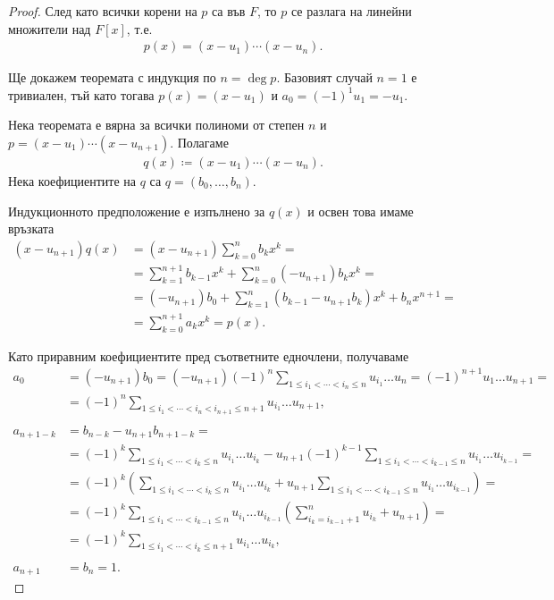 \documentclass[numbers=endperiod, bibliography=totocnumbered]{scrartcl}
\begin{document}
\begin{proof}
  След като всички корени на \( p \) са във \( F \), то \( p \) се разлага на линейни множители над \( F[x] \), т.е.
  \begin{align*}
    p(x) = (x - u_1) \cdots (x - u_n).
  \end{align*}

  Ще докажем теоремата с индукция по \( n = \deg p \). Базовият случай \( n = 1 \) е тривиален, тъй като тогава \( p(x) = (x - u_1) \) и \( a_0 = {(-1)}^1 u_1 = -u_1 \).

  Нека теоремата е вярна за всички полиноми от степен \( n \) и \( p = (x - u_1) \cdots (x - u_{n+1}) \). Полагаме
  \begin{align*}
    q(x) \coloneqq (x - u_1) \cdots (x - u_n).
  \end{align*}
  Нека коефициентите на \( q \) са \( q = (b_0, \ldots, b_n) \).

  Индукционното предположение е изпълнено за \( q(x) \) и освен това имаме връзката
  \begin{align*}
    (x - u_{n+1}) q(x)
    &=
    (x - u_{n+1}) \sum_{k=0}^n b_k x^k
    = \\ &=
    \sum_{k=1}^{n+1} b_{k-1} x^k + \sum_{k=0}^n (-u_{n+1}) b_k x^k
    = \\ &=
    (-u_{n+1}) b_0 + \sum_{k=1}^n (b_{k-1} - u_{n+1} b_k) x^k + b_n x^{n+1}
    = \\ &=
    \sum_{k=0}^{n+1} a_k x^k
    =
    p(x).
  \end{align*}

  Като приравним коефициентите пред съответните едночлени, получаваме
  \begin{align*}
    a_0
    &=
    (-u_{n+1}) b_0
    =
    (-u_{n+1}) {(-1)}^n \sum_{1 \leq i_1 < \cdots < i_n \leq n} u_{i_1} \ldots u_n
    =
    {(-1)}^{n+1} u_1 \ldots u_{n+1}
    = \\ &=
    {(-1)}^n \sum_{1 \leq i_1 < \cdots < i_n < i_{n+1} \leq n + 1} u_{i_1} \ldots u_{n+1},
    \\ \\
    a_{n+1-k}
    &=
    b_{n-k} - u_{n+1} b_{n+1-k}
    = \\ &=
    {(-1)}^k \sum_{1 \leq i_1 < \cdots < i_k \leq n} u_{i_1} \ldots u_{i_k} - u_{n+1} {(-1)}^{k-1} \sum_{1 \leq i_1 < \cdots < i_{k-1} \leq n} u_{i_1} \ldots u_{i_{k-1}}
    = \\ &=
    {(-1)}^k \left( \sum_{1 \leq i_1 < \cdots < i_k \leq n} u_{i_1} \ldots u_{i_k} + u_{n+1} \sum_{1 \leq i_1 < \cdots < i_{k-1} \leq n} u_{i_1} \ldots u_{i_{k-1}} \right)
    = \\ &=
    {(-1)}^k \sum_{1 \leq i_1 < \cdots < i_{k-1} \leq n} u_{i_1} \ldots u_{i_{k-1}} \left(\sum_{i_k=i_{k-1}+1}^n u_{i_k} + u_{n+1} \right)
    = \\ &=
    {(-1)}^k \sum_{1 \leq i_1 < \cdots < i_k \leq n + 1} u_{i_1} \ldots u_{i_k},
    \\ \\
    a_{n+1} &= b_n = 1.
  \end{align*}
\end{proof}
\end{document}
